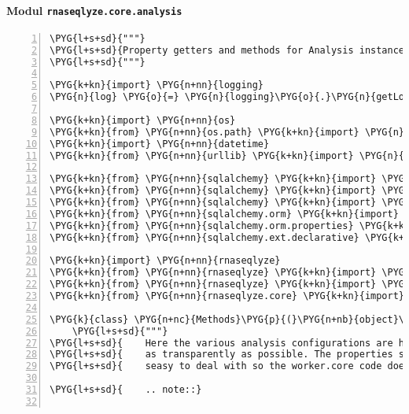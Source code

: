 \paragraph{Modul \texttt{rnaseqlyze.core.analysis}}
\label{rnaseqlyze-pdf:modul-rnaseqlyze-core-analysis}
\begin{Verbatim}[commandchars=\\\{\},numbers=left,firstnumber=1,stepnumber=5]
\PYG{l+s+sd}{"""}
\PYG{l+s+sd}{Property getters and methods for Analysis instances}
\PYG{l+s+sd}{"""}

\PYG{k+kn}{import} \PYG{n+nn}{logging}
\PYG{n}{log} \PYG{o}{=} \PYG{n}{logging}\PYG{o}{.}\PYG{n}{getLogger}\PYG{p}{(}\PYG{n}{\PYGZus{}\PYGZus{}name\PYGZus{}\PYGZus{}}\PYG{p}{)}

\PYG{k+kn}{import} \PYG{n+nn}{os}
\PYG{k+kn}{from} \PYG{n+nn}{os.path} \PYG{k+kn}{import} \PYG{n}{join}\PYG{p}{,} \PYG{n}{exists}
\PYG{k+kn}{import} \PYG{n+nn}{datetime}
\PYG{k+kn}{from} \PYG{n+nn}{urllib} \PYG{k+kn}{import} \PYG{n}{quote}

\PYG{k+kn}{from} \PYG{n+nn}{sqlalchemy} \PYG{k+kn}{import} \PYG{n}{ForeignKey}
\PYG{k+kn}{from} \PYG{n+nn}{sqlalchemy} \PYG{k+kn}{import} \PYG{n}{Table}\PYG{p}{,} \PYG{n}{Column}
\PYG{k+kn}{from} \PYG{n+nn}{sqlalchemy} \PYG{k+kn}{import} \PYG{n}{Boolean}\PYG{p}{,} \PYG{n}{Integer}\PYG{p}{,} \PYG{n}{String}\PYG{p}{,} \PYG{n}{Text}\PYG{p}{,} \PYG{n}{DateTime}
\PYG{k+kn}{from} \PYG{n+nn}{sqlalchemy.orm} \PYG{k+kn}{import} \PYG{n}{relationship}\PYG{p}{,} \PYG{n}{backref}\PYG{p}{,} \PYG{n}{validates}
\PYG{k+kn}{from} \PYG{n+nn}{sqlalchemy.orm.properties} \PYG{k+kn}{import} \PYG{n}{RelationshipProperty}
\PYG{k+kn}{from} \PYG{n+nn}{sqlalchemy.ext.declarative} \PYG{k+kn}{import} \PYG{n}{declared\PYGZus{}attr}\PYG{p}{,} \PYG{n}{declarative\PYGZus{}base}

\PYG{k+kn}{import} \PYG{n+nn}{rnaseqlyze}
\PYG{k+kn}{from} \PYG{n+nn}{rnaseqlyze} \PYG{k+kn}{import} \PYG{n}{galaxy}
\PYG{k+kn}{from} \PYG{n+nn}{rnaseqlyze} \PYG{k+kn}{import} \PYG{n}{ucscbrowser}
\PYG{k+kn}{from} \PYG{n+nn}{rnaseqlyze.core} \PYG{k+kn}{import} \PYG{n}{security}

\PYG{k}{class} \PYG{n+nc}{Methods}\PYG{p}{(}\PYG{n+nb}{object}\PYG{p}{)}\PYG{p}{:}
    \PYG{l+s+sd}{"""}
\PYG{l+s+sd}{    Here the various analysis configurations are handled}
\PYG{l+s+sd}{    as transparently as possible. The properties should be}
\PYG{l+s+sd}{    seasy to deal with so the worker.core code doesn't get too hairy.}

\PYG{l+s+sd}{    .. note::}


\end{Verbatim}
